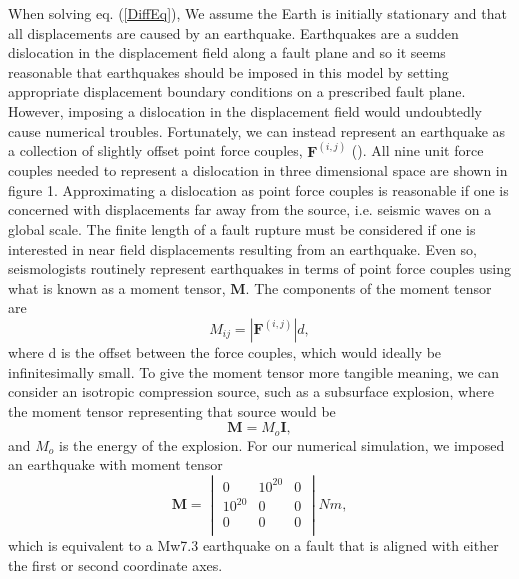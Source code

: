 \documentclass[12pt]{article}
\begin{document}
When solving eq. (\ref{DiffEq}), We assume the Earth is initially
stationary and that all displacements are caused by an earthquake.
Earthquakes are a sudden dislocation in the displacement field along a
fault plane and so it seems reasonable that earthquakes should be
imposed in this model by setting appropriate displacement boundary
conditions on a prescribed fault plane.  However, imposing a
dislocation in the displacement field would undoubtedly cause
numerical troubles.  Fortunately, we can instead represent an
earthquake as a collection of slightly offset point force couples,
$\boldsymbol{F}^{(i,j)}$ (\citet{AR2002}).  All nine unit force
couples needed to represent a dislocation in three dimensional space
are shown in figure 1. Approximating a dislocation as point force
couples is reasonable if one is concerned with displacements far away
from the source, i.e. seismic waves on a global scale.  The finite
length of a fault rupture must be considered if one is interested in
near field displacements resulting from an earthquake.  Even so,
seismologists routinely represent earthquakes in terms of point force
couples using what is known as a moment tensor, $\boldsymbol{M}$.  The
components of the moment tensor are
\begin{equation}\label{MomentTensorComponents}
  M_{ij} = |\boldsymbol{F}^{(i,j)}|d,
\end{equation}
where d is the offset between the force couples, which would ideally
be infinitesimally small.  To give the moment tensor more tangible
meaning, we can consider an isotropic compression source, such as a
subsurface explosion, where the moment tensor representing that source
would be
\begin{equation}
  \boldsymbol{M} = M_o\boldsymbol{I},
\end{equation}
and $M_o$ is the energy of the explosion. For our numerical
simulation, we imposed an earthquake with moment tensor
\begin{equation}
  \boldsymbol{M} = 
  \begin{vmatrix}
  0&10^{20}&0 \\
  10^{20}&0&0 \\
  0&0&0 \\
  \end{vmatrix} N m,
\end{equation}
which is equivalent to a Mw7.3 earthquake on a fault that is aligned
with either the first or second coordinate axes.  
\end{document}
